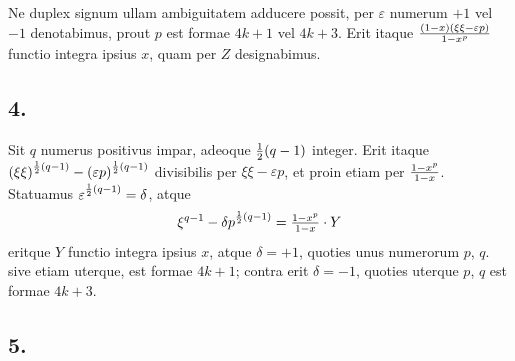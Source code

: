 \documentclass[twoside,12pt]{memoir}
\let\oldfrac\frac
\def\frac#1#2{\mathchoice{\tfrac{#1}{#2}}{\oldfrac{#1}{#2}}{\genfrac{}{}{}{2}{#1}{#2\mathstrut}}{\genfrac{}{}{}{3}{#1}{#2\mathstrut}}}
\begin{document}
Ne duplex signum ullam ambiguitatem adducere possit, per \(\varepsilon\) numerum \(+1\) vel \(-1\) denotabimus, prout \(p\) est formae \(4 k+1\) vel \(4 k+3\). Erit itaque \(\frac{(1-x)(\xi \xi-\varepsilon p)}{1-x^{p}}\) functio integra ipsius \(x\), quam per \(Z\) designabimus.

\subsection*{4.}
 
Sit \(q\) numerus positivus impar, adeoque \(\frac{1}{2}(q-1)\) integer. Erit itaque \((\xi \xi)^{\frac{1}{2}(q-1)}-(\varepsilon p)^{\frac{1}{2}(q-1)}\) divisibilis per \(\xi \xi-\varepsilon p\), et proin etiam per \(\frac{1-x^{p}}{1-x}\). Statuamus \(\varepsilon^{\frac{1}{2}(q-1)}=\delta\), atque
\[\xi^{q-1}-\delta p^{\frac{1}{2}(q-1)}=\frac{1-x^{p}}{1-x} \cdot Y\]
eritque \(Y\) functio integra ipsius \(x\), atque \(\delta=+1\), quoties unus numerorum \(p\), \(q\). sive etiam uterque, est formae \(4 k+1\); contra erit \(\delta=-1\), quoties uterque \(p\), \(q\) est formae \(4 k+3\).

\subsection*{5.}
 
\end{document}
